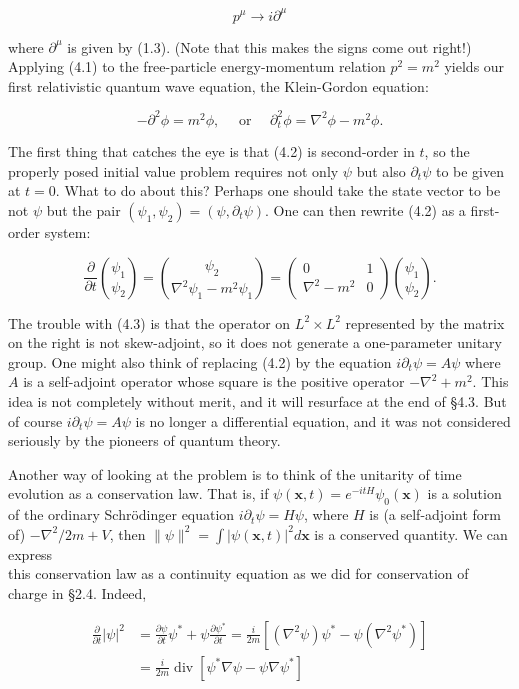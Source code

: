 \documentclass[10pt, letterpaper]{article}
\begin{document}
$$
p^{\mu} \rightarrow i \partial^{\mu}
$$

where $\partial^{\mu}$ is given by (1.3). (Note that this makes the signs come out right!) Applying (4.1) to the free-particle energy-momentum relation $p^{2}=m^{2}$ yields our first relativistic quantum wave equation, the Klein-Gordon equation:

$$
-\partial^{2} \phi=m^{2} \phi, \quad \text { or } \quad \partial_{t}^{2} \phi=\nabla^{2} \phi-m^{2} \phi .
$$

The first thing that catches the eye is that (4.2) is second-order in $t$, so the properly posed initial value problem requires not only $\psi$ but also $\partial_{t} \psi$ to be given at $t=0$. What to do about this? Perhaps one should take the state vector to be not $\psi$ but the pair $\left(\psi_{1}, \psi_{2}\right)=\left(\psi, \partial_{t} \psi\right)$. One can then rewrite (4.2) as a first-order system:

$$
\frac{\partial}{\partial t}\binom{\psi_{1}}{\psi_{2}}=\binom{\psi_{2}}{\nabla^{2} \psi_{1}-m^{2} \psi_{1}}=\left(\begin{array}{cc}
0 & 1 \\
\nabla^{2}-m^{2} & 0
\end{array}\right)\binom{\psi_{1}}{\psi_{2}} .
$$

The trouble with (4.3) is that the operator on $L^{2} \times L^{2}$ represented by the matrix on the right is not skew-adjoint, so it does not generate a one-parameter unitary group. One might also think of replacing (4.2) by the equation $i \partial_{t} \psi=A \psi$ where $A$ is a self-adjoint operator whose square is the positive operator $-\nabla^{2}+m^{2}$. This idea is not completely without merit, and it will resurface at the end of §4.3. But of course $i \partial_{t} \psi=A \psi$ is no longer a differential equation, and it was not considered seriously by the pioneers of quantum theory.

Another way of looking at the problem is to think of the unitarity of time evolution as a conservation law. That is, if $\psi(\mathbf{x}, t)=e^{-i t H} \psi_{0}(\mathbf{x})$ is a solution of the ordinary Schrödinger equation $i \partial_{t} \psi=H \psi$, where $H$ is (a self-adjoint form of) $-\nabla^{2} / 2 m+V$, then $\|\psi\|^{2}=\int|\psi(\mathbf{x}, t)|^{2} d \mathbf{x}$ is a conserved quantity. We can express\\
this conservation law as a continuity equation as we did for conservation of charge in §2.4. Indeed,

$$
\begin{aligned}
\frac{\partial}{\partial t}|\psi|^{2} & =\frac{\partial \psi}{\partial t} \psi^{*}+\psi \frac{\partial \psi^{*}}{\partial t}=\frac{i}{2 m}\left[\left(\nabla^{2} \psi\right) \psi^{*}-\psi\left(\nabla^{2} \psi^{*}\right)\right] \\
& =\frac{i}{2 m} \operatorname{div}\left[\psi^{*} \nabla \psi-\psi \nabla \psi^{*}\right]
\end{aligned}
$$
\end{document}
